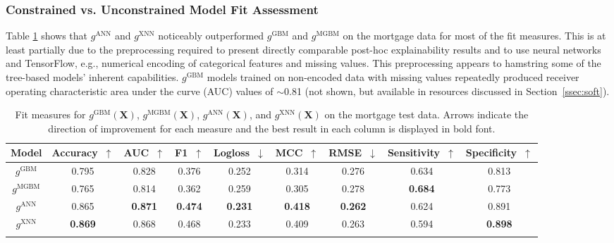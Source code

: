 \documentclass[information,article,accept,moreauthors,pdftex]{Definitions/mdpi}
\begin{document}
\subsubsection{Constrained vs. Unconstrained Model Fit Assessment}\label{ssec:c_v_uc_mort}

Table \ref{tab:mort_acc} shows that $g^\text{ANN}$ and $g^\text{XNN}$ noticeably outperformed $g^\text{GBM}$ and $g^\text{MGBM}$ on the mortgage data for most of the fit measures. This is at least partially due to the preprocessing required to present directly comparable post-hoc explainability results and to use neural networks and TensorFlow, e.g., numerical encoding of categorical features and missing values. This preprocessing appears to hamstring some of the tree-based models' inherent capabilities. $g^\text{GBM}$ models trained on non-encoded data with missing values repeatedly produced receiver operating characteristic area under the curve (AUC) values of $\sim$0.81 (not shown, but available in resources discussed in Section~\ref{ssec:soft}). 

\begin{table}[H]%
	\caption{Fit measures for $g^\text{GBM}(\mathbf{X})$, $g^\text{MGBM}(\mathbf{X})$, $g^\text{ANN}(\mathbf{X})$, and $g^\text{XNN}(\mathbf{X})$ on the mortgage test data. Arrows indicate the direction of improvement for each measure and the best result in each column is displayed in bold font.}
\centering
\begin{tabular}{ccccccccc}
	\toprule
	\textbf{Model} & 	
	{\textbf{{Accuracy}}}~$\uparrow$ & 
	{\textbf{{AUC}}}~$\uparrow$ & 
	{\textbf{{F1}}}~$\uparrow$ & 
	{\textbf{{Logloss}}}~$\downarrow$ & 
	{\textbf{{MCC}}}~$\uparrow$ & 
	{\textbf{{RMSE}}}~$\downarrow$ & 
	{\textbf{{Sensitivity}}}~$\uparrow$ & 
	{\textbf{{Specificity}}}~$\uparrow$ \\
	\midrule	
$g^\text{GBM}$		& 0.795	& 0.828	& 0.376 & 0.252 & 0.314 & 0.276 & 0.634 & 0.813 \\
$g^\text{MGBM}$		& 0.765	& 0.814	& 0.362 & 0.259 & 0.305 & 0.278 & \textbf{0.684} & 0.773 \\
$g^\text{ANN}$		& 0.865	& \textbf{0.871} & \textbf{0.474} & \textbf{0.231} & \textbf{0.418} & \textbf{0.262} & 0.624 & 0.891 \\
$g^\text{XNN}$		& \textbf{0.869} & 0.868 & 0.468 & 0.233 & 0.409 & 0.263 & 0.594 & \textbf{0.898} \\
\bottomrule
\label{tab:mort_acc}
\end{tabular}
\end{table}
\end{document}
